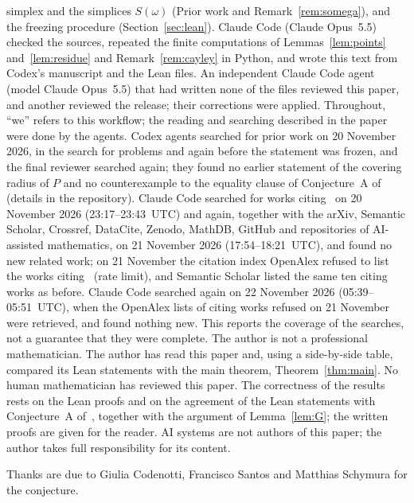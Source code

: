 \documentclass[11pt]{article}
\theoremstyle{definition}
\theoremstyle{remark}
\begin{document}
simplex and the simplices $S(\omega)$ (Prior work and
Remark~\ref{rem:somega}), and the freezing procedure
(Section~\ref{sec:lean}). Claude Code (Claude Opus~5.5) checked the sources,
repeated the finite computations of Lemmas~\ref{lem:points}
and~\ref{lem:residue} and Remark~\ref{rem:cayley} in Python, and wrote this
text from Codex's manuscript and the Lean files.
An independent Claude Code agent (model Claude Opus~5.5) that had written none of the files reviewed this paper, and another reviewed the release; their corrections were applied. Throughout, ``we'' refers to this workflow; the reading and
searching described in the paper were done by the agents. Codex agents
searched for prior work on 20 November 2026, in the search for problems and
again before the statement was frozen, and the final reviewer searched again;
they found no earlier statement of the covering radius of $P$ and no
counterexample to the equality clause of Conjecture~A of~\cite{css} (details
in the repository). Claude Code searched for works citing~\cite{css} on 20 November 2026 (23:17--23:43~UTC) and again, together with the arXiv, Semantic Scholar, Crossref, DataCite, Zenodo, MathDB, GitHub and repositories of AI-assisted mathematics, on 21 November 2026 (17:54--18:21~UTC), and found no new related work; on 21 November the citation index OpenAlex refused to list the works citing~\cite{css} (rate limit), and Semantic Scholar listed the same ten citing works as before. Claude Code searched again on 22 November 2026 (05:39--05:51~UTC), when the OpenAlex lists of citing works refused on 21 November were retrieved, and found nothing new. This reports the coverage of the
searches, not a guarantee that they were complete. The author is not a
professional mathematician. The author has read this paper and, using a side-by-side table, compared its Lean statements with the main theorem, Theorem~\ref{thm:main}. No human mathematician has reviewed
this paper. The correctness of the results rests on the Lean proofs and on the
agreement of the Lean statements with Conjecture~A of~\cite{css}, together with
the argument of Lemma~\ref{lem:G}; the written proofs are given for the
reader. AI systems are not authors of this paper; the author takes full
responsibility for its content.

\medskip
\noindent Thanks are due to Giulia Codenotti, Francisco Santos and Matthias
Schymura for the conjecture.
\end{document}
